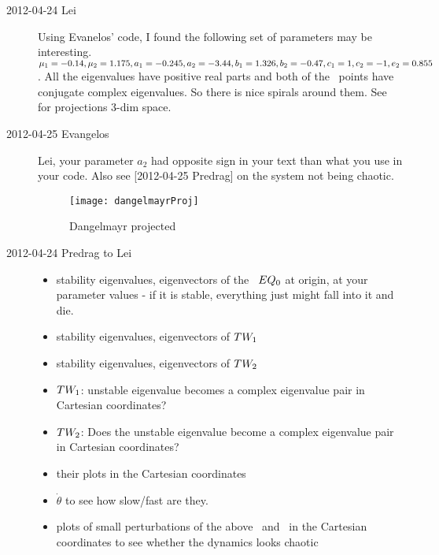 \begin{description}
\item[2012-04-24 Lei] Using Evanelos' code, I found the following set of
parameters may be interesting. $\mu_1=-0.14,\mu_2=1.175,
a_1=-0.245,a_2=-3.44, b_1=1.326, b_2=-0.47, c_1=1, c_2=-1, e_2=0.855$. All
the eigenvalues have positive real parts and both of the \eqv\
points have conjugate complex eigenvalues. So there is nice spirals
around them. See \reffig{fig:dangelmayr_proj} for projections
3-dim space.

\item[2012-04-25 Evangelos] Lei, your parameter $a_2$ had opposite sign in your text
than what you use in your code. Also see [2012-04-25 Predrag] on the system not being
chaotic.

\begin{figure}
\centering
\texttt{[image: dangelmayrProj]}
\caption{Dangelmayr projected}
\label{fig:dangelmayr_proj}
\end{figure}

\item[2012-04-24 Predrag to Lei]

\begin{itemize}
  \item stability eigenvalues, eigenvectors of the \eqv\ $EQ_{0}$ at
        origin, at your parameter values - if it is stable, everything
        just might fall into it and die.
  \item stability eigenvalues, eigenvectors of $TW_{1}$
  \item stability eigenvalues, eigenvectors of $TW_{2}$
  \item $TW_{1}$: unstable eigenvalue becomes a complex
        eigenvalue pair in Cartesian coordinates?
  \item $TW_{2}$: Does the unstable eigenvalue become a complex
        eigenvalue pair in Cartesian coordinates?
  \item their plots in the Cartesian coordinates
  \item $\dot{\theta}$ to see how slow/fast are they.
  \item plots of small perturbations of the above \eqv\ and \reqva\ in
        the Cartesian coordinates to see whether the dynamics looks
        chaotic
\end{itemize}


\end{description}
